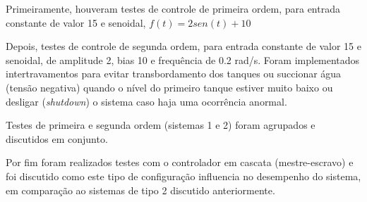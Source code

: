 %
%
Primeiramente, houveram testes de controle de primeira ordem, para entrada constante de valor 15 e senoidal,
$f(t)= 2sen(t)+10$

Depois, testes de controle de segunda ordem, para entrada constante de valor 15 e senoidal, de amplitude 2, bias 10 e frequência de 0.2 rad/s. Foram implementados intertravamentos para evitar transbordamento dos tanques ou succionar água (tensão negativa) quando o nível do primeiro tanque estiver muito baixo ou desligar (\emph{shutdown}) o sistema caso haja uma ocorrência anormal.

Testes de primeira e segunda ordem (sistemas 1 e 2) foram agrupados e discutidos em conjunto.

Por fim foram realizados testes com o controlador em cascata (mestre-escravo) e foi discutido como este tipo de configuração influencia no desempenho do sistema, em comparação ao sistemas de tipo 2 discutido anteriormente.
%
%
% 
% 
% 

% 
% 
% 
% 

% 
% 
\newpage
%
% 

\newpage
%
% 

\newpage
%
% 

\newpage
%
% 
